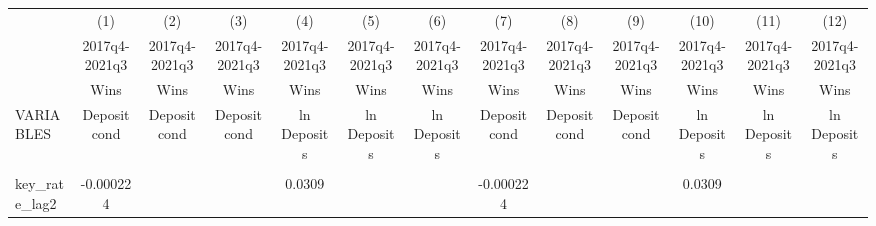 \documentclass[]{article}
\begin{document}
\begin{center}
\begin{tabular}{lcccccccccccc} \hline
 & (1) & (2) & (3) & (4) & (5) & (6) & (7) & (8) & (9) & (10) & (11) & (12) \\
 & 2017q4-2021q3 & 2017q4-2021q3 & 2017q4-2021q3 & 2017q4-2021q3 & 2017q4-2021q3 & 2017q4-2021q3 & 2017q4-2021q3 & 2017q4-2021q3 & 2017q4-2021q3 & 2017q4-2021q3 & 2017q4-2021q3 & 2017q4-2021q3 \\
 & Wins & Wins & Wins & Wins & Wins & Wins & Wins & Wins & Wins & Wins & Wins & Wins \\
VARIABLES & Deposit cond & Deposit cond & Deposit cond & ln Deposits & ln Deposits & ln Deposits & Deposit cond & Deposit cond & Deposit cond & ln Deposits & ln Deposits & ln Deposits \\ \hline
\vspace{4pt} & \begin{footnotesize}\end{footnotesize} & \begin{footnotesize}\end{footnotesize} & \begin{footnotesize}\end{footnotesize} & \begin{footnotesize}\end{footnotesize} & \begin{footnotesize}\end{footnotesize} & \begin{footnotesize}\end{footnotesize} & \begin{footnotesize}\end{footnotesize} & \begin{footnotesize}\end{footnotesize} & \begin{footnotesize}\end{footnotesize} & \begin{footnotesize}\end{footnotesize} & \begin{footnotesize}\end{footnotesize} & \begin{footnotesize}\end{footnotesize} \\
key\_rate\_lag2 & -0.000224 &  &  & 0.0309 &  &  & -0.000224 &  &  & 0.0309 &  &  \\

\end{tabular}
\end{center}
\end{document}
